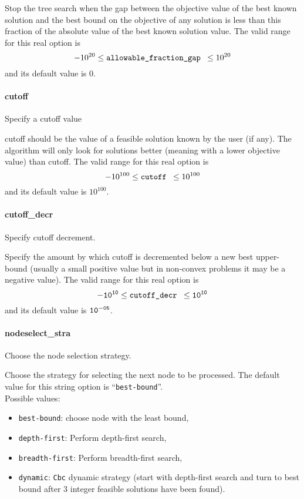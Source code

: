  Stop the tree search when the gap between the
objective value of the best known solution and
the best bound on the objective of any solution
is less than this fraction of the absolute value
of the best known solution value. The valid range for this real option is
$$-10^{20} \le \hbox{\tt allowable\_fraction\_gap } \le 10^{20}$$
and its default value is $0$.

\paragraph{cutoff}
\label{cutoff}
Specify a cutoff value

cutoff should be the value of a feasible solution known by the user
(if any). The algorithm will only look for solutions better (meaning with a lower objective value)
than cutoff. The valid range for this real option is
$$-10^{100} \le \hbox{\tt cutoff } \le 10^{100}$$
and its default value is $10^{100}$.


\paragraph{cutoff\_decr}
\label{cutoff_decr}
 Specify cutoff decrement.

 Specify the amount by which cutoff is decremented
below a new best upper-bound (usually a small
positive value but in non-convex problems it may
be a negative value). The valid range for this real option is
$${\tt -10^{10}} \le \hbox{\tt cutoff\_decr } \le {\tt 10^{10}}$$
and its default value is ${\tt 10^{-05}}$.


\paragraph{nodeselect\_stra}
\label{nodeselect_stra}
Choose the node selection strategy.

 Choose the strategy for selecting the next node
to be processed.
The default value for this string option is ``{\tt best-bound}''.
\\
Possible values:
\begin{itemize}
   \item {\tt best-bound}: choose node with the least bound,
   \item {\tt depth-first}: Perform depth-first search,
   \item {\tt breadth-first}: Perform breadth-first search,
   \item {\tt dynamic}: {\tt Cbc} dynamic strategy (start with depth-first
search and turn to best bound after 3 integer
feasible solutions have been found).
\end{itemize}


